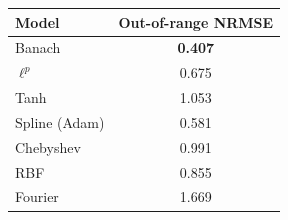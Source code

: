 \begin{tabular}{lc}
\toprule
Model & Out-of-range NRMSE \\
\midrule
Banach & \textbf{0.407} \\
$\ell^p$ & 0.675 \\
Tanh & 1.053 \\
Spline (Adam) & 0.581 \\
Chebyshev & 0.991 \\
RBF & 0.855 \\
Fourier & 1.669 \\
\bottomrule
\end{tabular}
